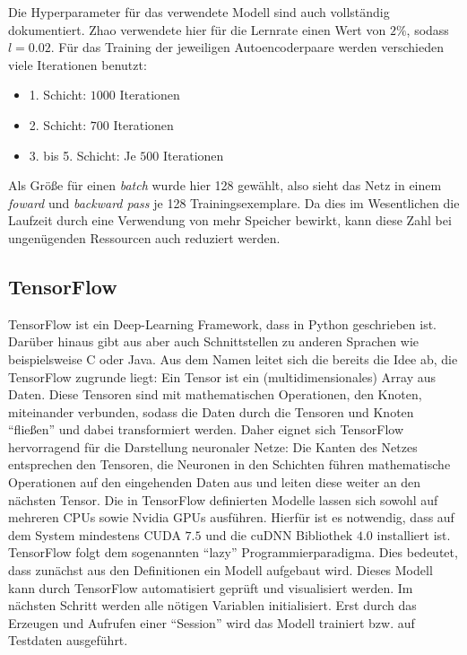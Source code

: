 Die Hyperparameter für das verwendete Modell sind auch vollständig dokumentiert. Zhao verwendete hier für die Lernrate einen Wert von $2\%$, sodass $l = 0.02$. Für das Training der jeweiligen Autoencoderpaare werden verschieden viele Iterationen benutzt:
\begin{itemize}
	\item 1. Schicht: $1000$ Iterationen
	\item 2. Schicht: $700$ Iterationen
	\item 3. bis 5. Schicht: Je $500$ Iterationen
\end{itemize}
Als Größe für einen \textit{batch} wurde hier 128 gewählt, also sieht das Netz in einem \textit{foward} und \textit{backward pass} je 128 Trainingsexemplare. Da dies im Wesentlichen die Laufzeit durch eine Verwendung von mehr Speicher bewirkt, kann diese Zahl bei ungenügenden Ressourcen auch reduziert werden.

\subsection{TensorFlow}

TensorFlow ist ein Deep-Learning Framework, dass in Python geschrieben ist. Darüber hinaus gibt aus aber auch Schnittstellen zu anderen Sprachen wie beispielsweise C oder Java. Aus dem Namen leitet sich die bereits die Idee ab, die TensorFlow zugrunde liegt: Ein Tensor ist ein (multidimensionales) Array aus Daten. Diese Tensoren sind mit mathematischen Operationen, den Knoten, miteinander verbunden, sodass die Daten durch die Tensoren und Knoten \enquote{fließen} und dabei transformiert werden. Daher eignet sich TensorFlow hervorragend für die Darstellung neuronaler Netze: Die Kanten des Netzes entsprechen den Tensoren, die Neuronen in den Schichten führen mathematische Operationen auf den eingehenden Daten aus und leiten diese weiter an den nächsten Tensor. Die in TensorFlow definierten Modelle lassen sich sowohl auf mehreren CPUs sowie Nvidia GPUs ausführen. Hierfür ist es notwendig, dass auf dem System mindestens CUDA $7.5$ und die cuDNN Bibliothek $4.0$ installiert ist. 
TensorFlow folgt dem sogenannten \enquote{lazy} Programmierparadigma. Dies bedeutet, dass zunächst aus den Definitionen ein Modell aufgebaut wird. Dieses Modell kann durch TensorFlow automatisiert geprüft und visualisiert werden. Im nächsten Schritt werden alle nötigen Variablen initialisiert. Erst durch das Erzeugen und Aufrufen einer \enquote{Session} wird das Modell trainiert bzw. auf Testdaten ausgeführt.

